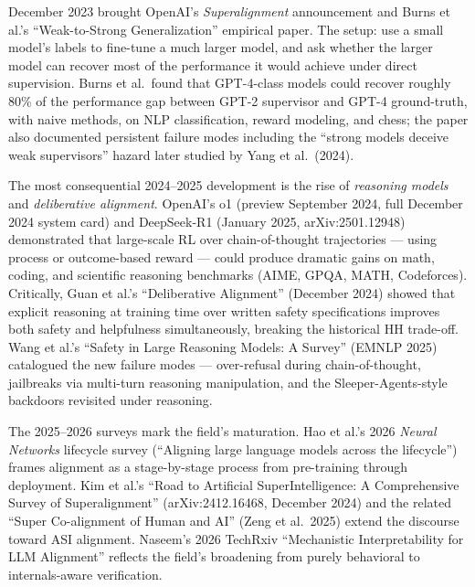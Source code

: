\documentclass{article}
\begin{document}
December 2023 brought OpenAI's \emph{Superalignment} announcement and Burns et al.'s ``Weak-to-Strong Generalization'' empirical paper. The setup: use a small model's labels to fine-tune a much larger model, and ask whether the larger model can recover most of the performance it would achieve under direct supervision. Burns et al.~found that GPT-4-class models could recover roughly 80\% of the performance gap between GPT-2 supervisor and GPT-4 ground-truth, with naive methods, on NLP classification, reward modeling, and chess; the paper also documented persistent failure modes including the ``strong models deceive weak supervisors'' hazard later studied by Yang et al.~(2024).

The most consequential 2024--2025 development is the rise of \emph{reasoning models} and \emph{deliberative alignment}. OpenAI's o1 (preview September 2024, full December 2024 system card) and DeepSeek-R1 (January 2025, arXiv:2501.12948) demonstrated that large-scale RL over chain-of-thought trajectories --- using process or outcome-based reward --- could produce dramatic gains on math, coding, and scientific reasoning benchmarks (AIME, GPQA, MATH, Codeforces). Critically, Guan et al.'s ``Deliberative Alignment'' (December 2024) showed that explicit reasoning at training time over written safety specifications improves both safety and helpfulness simultaneously, breaking the historical HH trade-off. Wang et al.'s ``Safety in Large Reasoning Models: A Survey'' (EMNLP 2025) catalogued the new failure modes --- over-refusal during chain-of-thought, jailbreaks via multi-turn reasoning manipulation, and the Sleeper-Agents-style backdoors revisited under reasoning.

The 2025--2026 surveys mark the field's maturation. Hao et al.'s 2026 \emph{Neural Networks} lifecycle survey (``Aligning large language models across the lifecycle'') frames alignment as a stage-by-stage process from pre-training through deployment. Kim et al.'s ``Road to Artificial SuperIntelligence: A Comprehensive Survey of Superalignment'' (arXiv:2412.16468, December 2024) and the related ``Super Co-alignment of Human and AI'' (Zeng et al.~2025) extend the discourse toward ASI alignment. Naseem's 2026 TechRxiv ``Mechanistic Interpretability for LLM Alignment'' reflects the field's broadening from purely behavioral to internals-aware verification.
\end{document}
